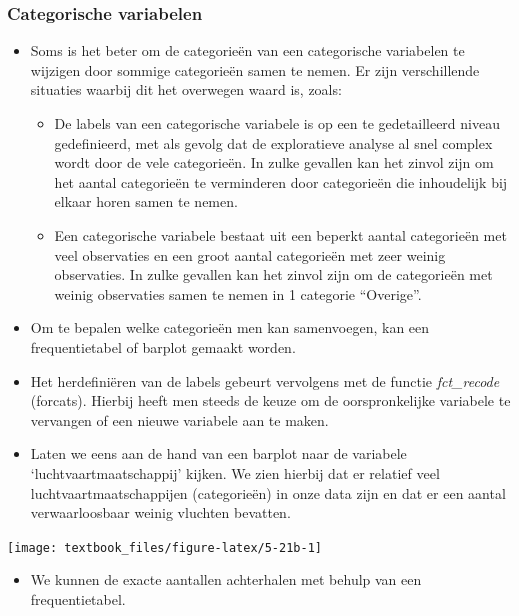 \documentclass[]{tufte-book}
\providecommand{\tightlist}{%
  \setlength{\itemsep}{0pt}\setlength{\parskip}{0pt}}
\begin{document}
\hypertarget{categorische-variabelen}{%
\subsubsection{Categorische variabelen}\label{categorische-variabelen}}

\begin{itemize}
\tightlist
\item
  Soms is het beter om de categorieën van een categorische variabelen te wijzigen door sommige categorieën samen te nemen. Er zijn verschillende situaties waarbij dit het overwegen waard is, zoals:

  \begin{itemize}
  \tightlist
  \item
    De labels van een categorische variabele is op een te gedetailleerd niveau gedefinieerd, met als gevolg dat de exploratieve analyse al snel complex wordt door de vele categorieën. In zulke gevallen kan het zinvol zijn om het aantal categorieën te verminderen door categorieën die inhoudelijk bij elkaar horen samen te nemen.
  \item
    Een categorische variabele bestaat uit een beperkt aantal categorieën met veel observaties en een groot aantal categorieën met zeer weinig observaties. In zulke gevallen kan het zinvol zijn om de categorieën met weinig observaties samen te nemen in 1 categorie ``Overige''.
  \end{itemize}
\item
  Om te bepalen welke categorieën men kan samenvoegen, kan een frequentietabel of barplot gemaakt worden.
\item
  Het herdefiniëren van de labels gebeurt vervolgens met de functie \emph{fct\_recode} (forcats). Hierbij heeft men steeds de keuze om de oorspronkelijke variabele te vervangen of een nieuwe variabele aan te maken.
\item
  Laten we eens aan de hand van een barplot naar de variabele `luchtvaartmaatschappij' kijken. We zien hierbij dat er relatief veel luchtvaartmaatschappijen (categorieën) in onze data zijn en dat er een aantal verwaarloosbaar weinig vluchten bevatten.
\end{itemize}

\texttt{[image: textbook\_files/figure-latex/5-21b-1]}

\begin{itemize}
\tightlist
\item
  We kunnen de exacte aantallen achterhalen met behulp van een frequentietabel.
\end{itemize}
\end{document}
